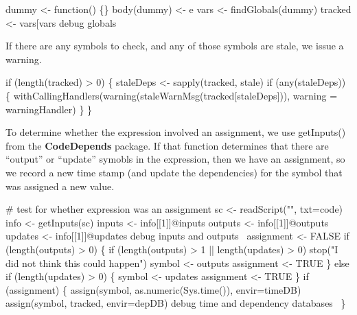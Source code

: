 \documentclass[a4paper]{article}%
\newcommand{\pkg}[1]{{\bf #1}}
\begin{document}
\nwenddocs{}\endmoddef\nwstartdeflinemarkup{}\nwenddeflinemarkup
dummy <- function() \{\}
body(dummy) <- e
vars <- findGlobals(dummy)
tracked <- vars[vars %
\LA{}debug globals~{\nwtagstyle{}}\RA{}
\nwendcode{}\nwdocspar

If there are any symbols to check, and any of those symbols
are stale, we issue a warning.

\nwenddocs{}\endmoddef\nwstartdeflinemarkup{}\nwenddeflinemarkup
if (length(tracked) > 0) \{
    staleDeps <- sapply(tracked, stale)
    if (any(staleDeps)) \{
        withCallingHandlers(warning(staleWarnMsg(tracked[staleDeps])),
                            warning = warningHandler)
    \}
\}
\nwendcode{}\nwdocspar

To determine whether the expression involved an assignment, we
use {\Tt{}getInputs()\nwendquote} from the \pkg{CodeDepends} package.
If that function determines that there are ``output'' or ``update''
symobls in the expression, then we have an assignment,
so we record a new time stamp (and update the dependencies) for the
symbol that was assigned a new value.

\nwenddocs{}\endmoddef\nwstartdeflinemarkup{}\nwenddeflinemarkup
# test for whether expression was an assignment
sc <- readScript("", txt=code)
info <- getInputs(sc)
inputs <- info[[1]]@inputs
outputs <- info[[1]]@outputs
updates <- info[[1]]@updates
\LA{}debug inputs and outputs~{\nwtagstyle{}}\RA{}
assignment <- FALSE
if (length(outputs) > 0) \{
    if (length(outputs) > 1 || length(updates) > 0)
        stop("I did not think this could happen")
    symbol <- outputs
    assignment <- TRUE
\} else if (length(updates) > 0) \{
    symbol <- updates
    assignment <- TRUE    
\}
if (assignment) \{
    assign(symbol, as.numeric(Sys.time()), envir=timeDB)
    assign(symbol, tracked, envir=depDB)
    \LA{}debug time and dependency databases~{\nwtagstyle{}}\RA{}
\}
\nwendcode{}\nwdocspar
\end{document}

